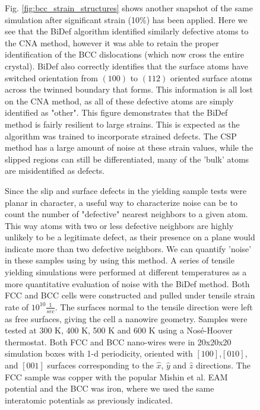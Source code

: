 \documentclass[12pt]{iopart}
\begin{document}
\begin{figure}[htbp]
Fig. \ref{fig:bcc_strain_structures} shows another snapshot of the same simulation after significant strain (10\%) has been applied. Here we see that the BiDef algorithm identified similarly defective atoms to the CNA method, however it was able to retain the proper identification of the BCC dislocations (which now cross the entire crystal). BiDef also correctly identifies that the surface atoms have switched orientation from $(100)$ to $(112)$ oriented surface atoms across the twinned boundary that forms. This information is all lost on the CNA method, as all of these defective atoms are simply identified as "other". This figure demonstrates that the BiDef method is fairly resilient to large strains. This is expected as the algorithm was trained to incorporate strained defects. The CSP method has a large amount of noise at these strain values, while the slipped regions can still be differentiated, many of the 'bulk' atoms are misidentified as defects. 

Since the slip and surface defects in the yielding sample tests were planar in character, a useful way to characterize noise can be to count the number of "defective" nearest neighbors to a given atom. This way atoms with two or less defective neighbors are highly unlikely to be a legitimate defect, as their presence on a plane would indicate more than two defective neighbors. We can quantify 'noise' in these samples using by using this method. A series of tensile yielding simulations were performed at different temperatures as a more quantitative evaluation of noise with the BiDef method. Both FCC and BCC cells were constructed and pulled under tensile strain rate of $10^{10} \frac{1}{sec}$. The surfaces normal to the tensile direction were left as free surfaces, giving the cell a nanowire geometry. Samples were tested at 300 K, 400 K, 500 K and 600 K using a Nosé-Hoover thermostat. Both FCC and BCC nano-wires were in 20x20x20 simulation boxes with 1-d periodicity, oriented with $[100]$,$[010]$, and $[001]$ surfaces corresponding to the $\hat{x}$, $\hat{y}$ and $\hat{z}$ directions. The FCC sample was copper with the popular Mishin et al. EAM potential\cite{Mishin2001} and the BCC was iron, where we used the same interatomic potentials as previously indicated.\cite{Mendelev2003}


\end{figure}
\end{document}
